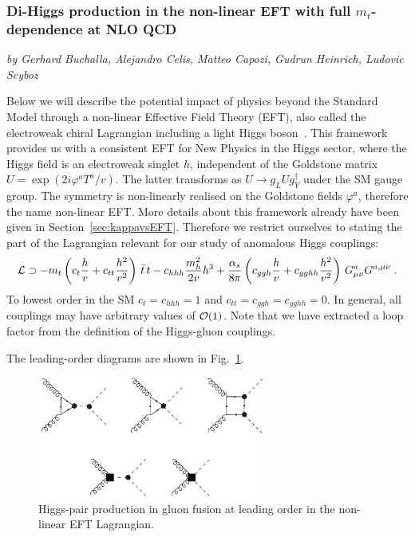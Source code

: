 \subsubsection{Di-Higgs production in the non-linear EFT with full $m_t$-dependence at NLO QCD}

\begin{center}
\textit{by Gerhard Buchalla, Alejandro Celis, Matteo Capozi, Gudrun Heinrich, Ludovic Scyboz}
\end{center}


\label{sec:EWChL.double.h}

Below we will describe  the potential impact of physics
beyond the Standard Model through a non-linear Effective Field Theory (EFT),
also called the electroweak chiral Lagrangian
including a light Higgs 
boson~\cite{Buchalla:2013rka,Buchalla:2013eza,Buchalla:2017jlu}.
This framework provides us with a consistent EFT
for New Physics in the Higgs sector, where the Higgs field is an electroweak singlet $h$,
independent of the Goldstone matrix $U = \exp(2i\varphi^a T^a/v)$.
The latter transforms as $U\to g_L U g^\dagger_Y$ under the SM gauge group.
The symmetry is non-linearly realised on the Goldstone fields
$\varphi^a$, therefore the name non-linear EFT.
More details about this framework already have been given in
Section~\ref{sec:kappavsEFT}.
Therefore we restrict ourselves to stating the part of the Lagrangian
relevant for our study of anomalous Higgs couplings:
\begin{align}
{\cal L}\supset 
-m_t\left(c_t\frac{h}{v}+c_{tt}\frac{h^2}{v^2}\right)\,\bar{t}\,t -
c_{hhh} \frac{m_h^2}{2v} h^3+\frac{\alpha_s}{8\pi} \left( c_{ggh} \frac{h}{v}+
c_{gghh}\frac{h^2}{v^2}  \right)\, G^a_{\mu \nu} G^{a,\mu \nu}\;.
\label{eq:ewchl}
\end{align}
To lowest order in the SM $c_t=c_{hhh}=1$ and $c_{tt}=c_{ggh}=c_{gghh}=0$.
In general, all couplings may have arbitrary values of ${\cal O}(1)$.
Note that we have extracted a loop factor from the definition of the
Higgs-gluon couplings.  


The leading-order diagrams are shown in Fig.~\ref{fig:hprocess}.
\begin{figure}[htb]
\begin{center}
\includegraphics[width=7.5cm]{section3/plots/hprocess.pdf}
\end{center}
\caption{Higgs-pair production in gluon fusion at leading order
in the non-linear EFT Lagrangian.}
\label{fig:hprocess}
\end{figure}

